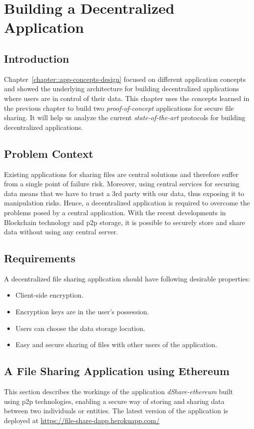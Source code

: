 \chapter{Building a Decentralized Application}\label{chapter:building-dapp}

\section{Introduction}
Chapter~\ref{chapter::app-concepts-design} focused on different application concepts and showed the underlying architecture for building decentralized applications where users are in control of their data. This chapter uses the concepts learned in the previous chapter to build two \textit{proof-of-concept} applications for secure file sharing. It will help us analyze the current \textit{state-of-the-art} protocols for building decentralized applications.

\section{Problem Context}
Existing applications for sharing files are central solutions and therefore suffer from a single point of failure risk. Moreover, using central services for securing data means that we have to trust a 3rd party with our data, thus exposing it to manipulation risks. Hence, a decentralized application is required to overcome the problems posed by a central application. With the recent developments in Blockchain technology and p2p storage, it is possible to securely store and share data without using any central server.

\section{Requirements}\label{sec:requirements}
A decentralized file sharing application should have following desirable properties:
\begin{itemize}
	\item Client-side encryption.
	\item Encryption keys are in the user's possession.
	\item Users can choose the data storage location.
	\item Easy and secure sharing of files with other users of the application.
\end{itemize}

\section{A File Sharing Application using Ethereum}
This section describes the workings of the application \textit{dShare-ethereum}\cite{harsh_kedia_2019_3359852} built using p2p technologies, enabling a secure way of storing and sharing data between two individuals or entities. The latest version of the application is deployed at \url{https://file-share-dapp.herokuapp.com/}

